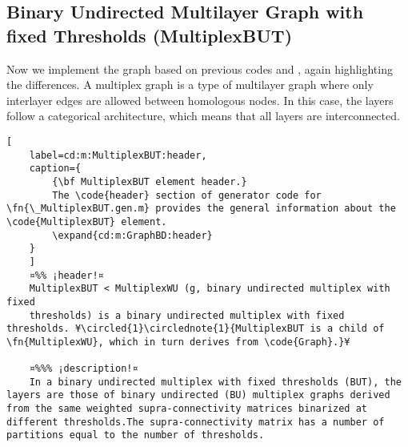 \documentclass{tufte-handout}
\begin{document}
\clearpage

\subsection{Binary Undirected Multilayer Graph with fixed Thresholds (MultiplexBUT)}

Now we implement the  graph based on previous codes  and , again highlighting the differences.
A multiplex graph is a type of multilayer graph where only interlayer edges are allowed between homologous nodes. In this case, the layers follow a categorical architecture, which means that all layers are interconnected.

\begin{lstlisting}[
	label=cd:m:MultiplexBUT:header,
	caption={
		{\bf MultiplexBUT element header.}
		The \code{header} section of generator code for \fn{\_MultiplexBUT.gen.m} provides the general information about the \code{MultiplexBUT} element.
		\expand{cd:m:GraphBD:header}
	}
	]
	¤%% ¡header!¤
	MultiplexBUT < MultiplexWU (g, binary undirected multiplex with fixed
	thresholds) is a binary undirected multiplex with fixed thresholds. ¥\circled{1}\circlednote{1}{MultiplexBUT is a child of \fn{MultiplexWU}, which in turn derives from \code{Graph}.}¥
	
	¤%%% ¡description!¤
	In a binary undirected multiplex with fixed thresholds (BUT), the layers are those of binary undirected (BU) multiplex graphs derived from the same weighted supra-connectivity matrices binarized at different thresholds.The supra-connectivity matrix has a number of partitions equal to the number of thresholds.

\end{lstlisting}
\end{document}
